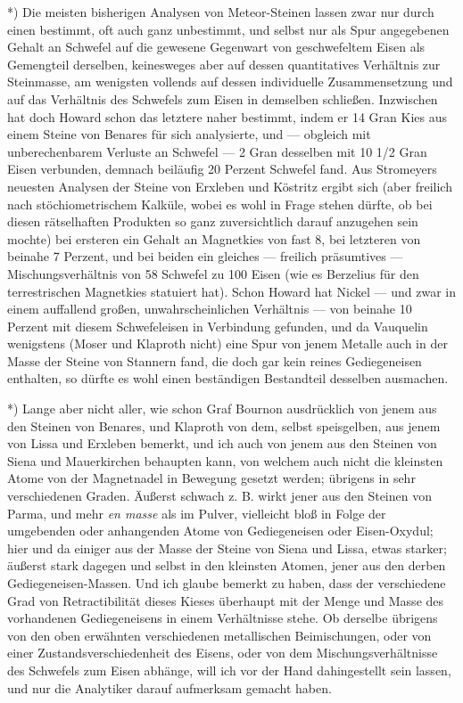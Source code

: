 \documentclass[a4paper, 11pt, oneside, german]{article}
\begin{document}
*) Die meisten bisherigen Analysen von Meteor-Steinen lassen zwar nur durch einen bestimmt, oft auch ganz unbestimmt, und selbst nur als Spur angegebenen Gehalt an Schwefel auf die gewesene Gegenwart von geschwefeltem Eisen als Gemengteil derselben, keinesweges aber auf dessen quantitatives Verhältnis zur Steinmasse, am wenigsten vollends auf dessen individuelle Zusammensetzung und auf das Verhältnis des Schwefels zum Eisen in demselben schließen. Inzwischen hat doch Howard schon das letztere naher bestimmt, indem er 14 Gran Kies aus einem Steine von Benares für sich analysierte, und --- obgleich mit unberechenbarem Verluste an Schwefel --- 2 Gran desselben mit 10 1/2 Gran Eisen verbunden, demnach beiläufig 20 Perzent Schwefel fand. Aus Stromeyers neuesten Analysen der Steine von Erxleben und Köstritz ergibt sich (aber freilich nach stöchiometrischem Kalküle, wobei es wohl in Frage stehen dürfte, ob bei diesen rätselhaften Produkten so ganz zuversichtlich darauf anzugehen sein mochte) bei ersteren ein Gehalt an Magnetkies von fast 8, bei letzteren von beinahe 7 Perzent, und bei beiden ein gleiches --- freilich präsumtives --- Mischungsverhältnis von 58 Schwefel zu 100 Eisen (wie es Berzelius für den terrestrischen Magnetkies statuiert hat). Schon Howard hat Nickel --- und zwar in einem auffallend großen, unwahrscheinlichen Verhältnis --- von beinahe 10 Perzent mit diesem Schwefeleisen in Verbindung gefunden, und da Vauquelin wenigstens (Moser und Klaproth nicht) eine Spur von jenem Metalle auch in der Masse der Steine von Stannern fand, die doch gar kein reines Gediegeneisen enthalten, so dürfte es wohl einen beständigen Bestandteil desselben ausmachen.

*) Lange aber nicht aller, wie schon Graf Bournon ausdrücklich von jenem aus den Steinen von Benares, und Klaproth von dem, selbst speisgelben, aus jenem von Lissa und Erxleben bemerkt, und ich auch von jenem aus den Steinen von Siena und Mauerkirchen behaupten kann, von welchem auch nicht die kleinsten Atome von der Magnetnadel in Bewegung gesetzt werden; übrigens in sehr verschiedenen Graden. Äußerst schwach z. B. wirkt jener aus den Steinen von Parma, und mehr \emph{en masse} als im Pulver, vielleicht bloß in Folge der umgebenden oder anhangenden Atome von Gediegeneisen oder Eisen-Oxydul; hier und da einiger aus der Masse der Steine von Siena und Lissa, etwas starker; äußerst stark dagegen und selbst in den kleinsten Atomen, jener aus den derben Gediegeneisen-Massen. Und ich glaube bemerkt zu haben, dass der verschiedene Grad von Retractibilität dieses Kieses überhaupt mit der Menge und Masse des vorhandenen Gediegeneisens in einem Verhältnisse stehe. Ob derselbe übrigens von den oben erwähnten verschiedenen metallischen Beimischungen, oder von einer Zustandsverschiedenheit des Eisens, oder von dem Mischungsverhältnisse des Schwefels zum Eisen abhänge, will ich vor der Hand dahingestellt sein lassen, und nur die Analytiker darauf aufmerksam gemacht haben.
\end{document}
